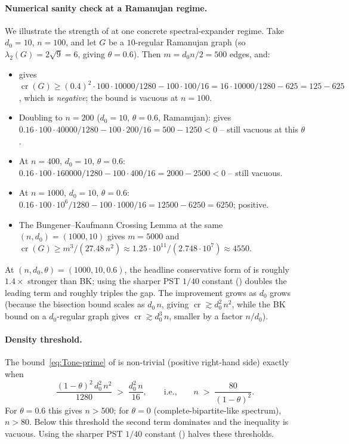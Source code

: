 \documentclass[11pt,a4paper]{article}
\theoremstyle{definition}
\DeclareMathOperator{\crN}{cr}
\begin{document}
\paragraph{Numerical sanity check at a Ramanujan regime.}
We illustrate the strength of  at one concrete
spectral-expander regime. Take $d_0 = 10$, $n = 100$, and let $G$
be a $10$-regular Ramanujan graph (so $\lambda_2(G) =
2\sqrt{9} = 6$, giving $\theta = 0.6$). Then $m = d_0 n/2 = 500$
edges, and:
\begin{itemize}
  \item {} gives $\crN(G) \ge (0.4)^{2} \cdot 100 \cdot
        10000 / 1280 - 100 \cdot 100 / 16
        = 16 \cdot 10000 / 1280 - 625
        = 125 - 625$, which is \emph{negative}; the bound is
        vacuous at $n = 100$.
  \item Doubling to $n = 200$ ($d_0 = 10$, $\theta = 0.6$,
        Ramanujan):  gives
        $0.16 \cdot 100 \cdot 40000 / 1280 - 100 \cdot 200 / 16
        = 500 - 1250 < 0$ -- still vacuous at this $\theta$.
  \item At $n = 400$, $d_0 = 10$, $\theta = 0.6$:
        $0.16 \cdot 100 \cdot 160000 / 1280 - 100 \cdot 400 / 16
        = 2000 - 2500 < 0$ -- still vacuous.
  \item At $n = 1000$, $d_0 = 10$, $\theta = 0.6$:
        $0.16 \cdot 100 \cdot 10^{6} / 1280 - 100 \cdot 1000/16
        = 12500 - 6250 = 6250$; positive.
  \item The Bungener--Kaufmann Crossing Lemma at the same
        $(n, d_0) = (1000, 10)$ gives $m = 5000$ and
        $\crN(G) \ge m^{3}/(27.48\,n^{2})
        \approx 1.25 \cdot 10^{11}/(2.748 \cdot 10^{7}) \approx 4550$.
\end{itemize}
At $(n, d_0, \theta) = (1000, 10, 0.6)$, the headline
conservative form of  is roughly $1.4\times$
stronger than BK; using the sharper PST $1/40$ constant
() doubles the leading term and roughly
triples the gap. The improvement grows as
$d_0$ grows (because the bisection bound scales as $d_0\,n$,
giving $\crN \gtrsim d_0^{2}\,n^{2}$, while the BK bound on a
$d_0$-regular graph gives $\crN \gtrsim d_0^{3}\,n$, smaller by a
factor $n/d_0$).

\paragraph{Density threshold.}
The bound~\eqref{eq:Tone-prime} of  is
non-trivial (positive right-hand side) exactly when
\[
   \frac{(1 - \theta)^{2}\,d_0^{2}\,n^{2}}{1280} \;>\; \frac{d_0^{2}\,n}{16},
   \qquad \text{i.e.,} \qquad n \;>\; \frac{80}{(1 - \theta)^{2}}.
\]
For $\theta = 0.6$ this gives $n > 500$; for $\theta = 0$
(complete-bipartite-like spectrum), $n > 80$. Below this
threshold the second term dominates and the inequality is
vacuous. Using the sharper PST $1/40$ constant
() halves these thresholds.
\end{document}

